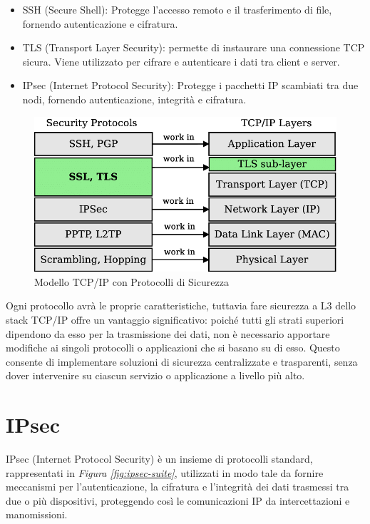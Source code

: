 \begin{itemize}
    \item SSH (Secure Shell): Protegge l'accesso remoto e il trasferimento
    di file, fornendo autenticazione e cifratura.
    \item TLS (Transport Layer Security): permette di instaurare una
    connessione TCP sicura. Viene utilizzato per cifrare e autenticare i dati tra
    client e server.
    \item IPsec (Internet Protocol Security): Protegge i pacchetti IP
    scambiati tra due nodi, fornendo autenticazione, integrità e cifratura.
\end{itemize}


\begin{figure}[h!]
    \centering
    \includegraphics[scale=0.3]{Figures/security_tcp.png}
    \caption{Modello TCP/IP con Protocolli di Sicurezza}
    \label{fig:tcpip}
\end{figure}

\noindent
Ogni protocollo avrà le proprie caratteristiche, tuttavia fare sicurezza a L3 dello stack TCP/IP offre un vantaggio significativo:
poiché tutti gli strati superiori dipendono da esso per la trasmissione dei dati,
non è necessario apportare modifiche ai singoli protocolli o applicazioni che
si basano su di esso. Questo consente di implementare soluzioni di sicurezza
centralizzate e trasparenti, senza dover intervenire su ciascun servizio o
applicazione a livello più alto.



\section{IPsec}

IPsec (Internet Protocol Security) è un insieme di protocolli standard, rappresentati in \textit{Figura \ref{fig:ipsec-suite}}, utilizzati
in modo tale da fornire meccanismi per l'autenticazione, la cifratura e l'integrità dei dati trasmessi tra due o più
dispositivi, proteggendo così le comunicazioni IP da intercettazioni e manomissioni.

